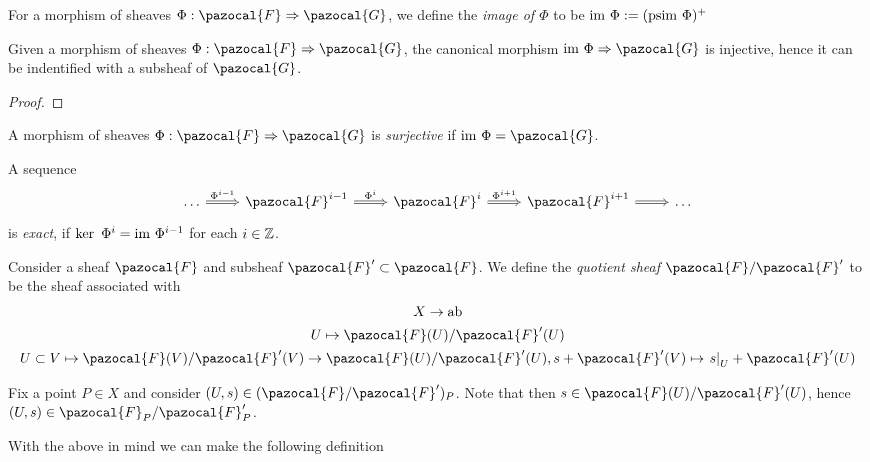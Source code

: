 \begin{definition}
    For a morphism of sheaves $\Phi: \pazocal{F}\Rightarrow \pazocal{G}$, we define the \emph{image of $\Phi$} to be $\im \ \Phi:= (\mathrm{psim}\ \Phi)^{+}$
\end{definition}
\begin{proposition}
    Given a morphism of sheaves $\Phi:\pazocal{F}\Rightarrow \pazocal{G}$, the canonical morphism $\im\ \Phi\Rightarrow \pazocal{G}$ is injective, hence it can be indentified with a subsheaf of $\pazocal{G}$. 
\end{proposition}
\begin{proof}
    
\end{proof}
\begin{definition}
    A morphism of sheaves $\Phi:\pazocal{F}\Rightarrow \pazocal{G}$ is \emph{surjective} if $\im\ \Phi = \pazocal{G}$.
\end{definition}
\begin{definition}
    A sequence 
    $$
        \begin{tikzcd}
            \dots \arrow[r, Rightarrow, "\Phi^{i-1}"] & \pazocal{F}^{i-1} \arrow[r, Rightarrow, "\Phi^i"] & \pazocal{F}^i \arrow[r, Rightarrow, "\Phi^{i+1}"] & \pazocal{F}^{i+1} \arrow[r, Rightarrow] & \dots
        \end{tikzcd}
    $$
    is \emph{exact}, if $\ker\ \Phi^i = \mathrm{im} \ \Phi^{i-1}$ for each $i \in \mathbb{Z}$. 
\end{definition}
\begin{definition}
    Consider a sheaf $\pazocal{F}$ and subsheaf $\pazocal{F}'\subset \pazocal{F}$. We define the \emph{quotient sheaf $\pazocal{F}/\pazocal{F}'$} to be the sheaf associated with 
    \begin{gather*}
        X\rightarrow \mathrm{ab}\\
        U\mapsto \pazocal{F}(U)/\pazocal{F}'(U)\\
        U\subset V \mapsto \pazocal{F}(V)/\pazocal{F}'(V) \rightarrow \pazocal{F}(U)/\pazocal{F}'(U), s + \pazocal{F}'(V) \mapsto \left. s\right|_{U}+\pazocal{F}'(U)
    \end{gather*}
\end{definition}
\begin{remark}
    Fix a point $P\in X$ and consider $(U,s)\in (\pazocal{F}/\pazocal{F}')_P$. Note that then $s\in \pazocal{F}(U)/\pazocal{F}'(U)$, hence $(U,s)\in \pazocal{F}_P/\pazocal{F}'_P$.
\end{remark}
With the above in mind we can make the following definition
